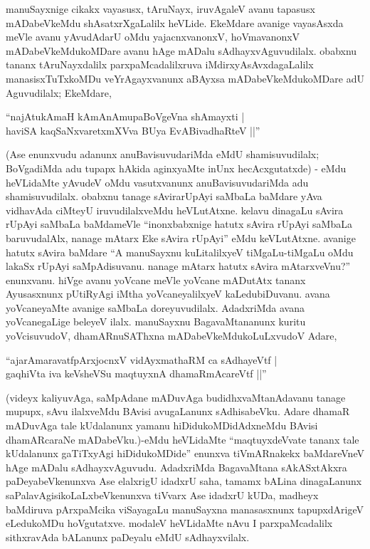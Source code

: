 manuSayxnige cikakx vayasusx, tAruNayx, iruvAgaleV avanu tapasusx mADabeVkeMdu shAsatxrXgaLalilx heVLide. EkeMdare avanige vayasAsxda meVle avanu yAvudAdarU oMdu yajacnxvanonxV, hoVmavanonxV mADabeVkeMdukoMDare avanu hAge mADalu sAdhayxvAguvudilalx. obabxnu tananx tAruNayxdalilx parxpaMcadalilxruva iMdirxyAsAvxdagaLalilx manasisxTuTxkoMDu veYrAgayxvanunx aBAyxsa mADabeVkeMdukoMDare adU Aguvudilalx; EkeMdare,

\begin{shloka}
``najAtukAmaH kAmAnAmupaBoVgeVna shAmayxti |\\
haviSA kaqSaNxvaretxmXVva BUya EvABivadhaRteV ||''
\end{shloka}

(Ase enunxvudu adanunx anuBavisuvudariMda eMdU shamisuvudilalx; BoVgadiMda adu tupapx hAkida aginxyaMte inUnx hecAcxgutatxde) - eMdu heVLidaMte yAvudeV oMdu vasutxvanunx anuBavisuvudariMda adu shamisuvudilalx. obabxnu tanage sAvirarUpAyi saMbaLa baMdare yAva vidhavAda ciMteyU iruvudilalxveMdu heVLutAtxne. kelavu dinagaLu sAvira rUpAyi saMbaLa baMdameVle ``inonxbabxnige hatutx sAvira rUpAyi saMbaLa baruvudalAlx, nanage mAtarx Eke sAvira rUpAyi'' eMdu keVLutAtxne. avanige hatutx sAvira baMdare ``A manuSayxnu kuLitalilxyeV tiMgaLu-tiMgaLu oMdu lakaSx rUpAyi saMpAdisuvanu. nanage mAtarx hatutx sAvira mAtarxveVnu?'' enunxvanu. hiVge avanu yoVcane meVle yoVcane mADutAtx tananx Ayusasxnunx pUtiRyAgi iMtha yoVcaneyalilxyeV kaLedubiDuvanu. avana yoVcaneyaMte avanige saMbaLa doreyuvudilalx. AdadxriMda avana yoVcanegaLige beleyeV ilalx. manuSayxnu BagavaMtananunx kuritu yoVcisuvudoV, dhamARnuSAThxna mADabeVkeMdukoLuLxvudoV Adare,

\begin{shloka}
``ajarAmaravatfpArxjocnxV vidAyxmathaRM ca sAdhayeVtf |\\
gaqhiVta iva keVsheVSu maqtuyxnA dhamaRmAcareVtf ||''
\end{shloka}

(videyx kaliyuvAga, saMpAdane mADuvAga budidhxvaMtanAdavanu tanage mupupx, sAvu ilalxveMdu BAvisi avugaLanunx sAdhisabeVku. Adare dhamaR mADuvAga tale kUdalanunx yamanu hiDidukoMDidAdxneMdu BAvisi dhamARcaraNe mADabeVku.)-eMdu heVLidaMte ``maqtuyxdeVvate tananx tale kUdalanunx gaTiTxyAgi hiDidukoMDide'' enunxva tiVmARnakekx baMdareVneV hAge mADalu sAdhayxvAguvudu. AdadxriMda BagavaMtana sAkASxtAkxra paDeyabeVkenunxva Ase elalxrigU idadxrU saha, tamamx bALina dinagaLanunx saPalavAgisikoLaLxbeVkenunxva tiVvarx Ase idadxrU kUDa, madheyx baMdiruva pArxpaMcika viSayagaLu manuSayxna manasasxnunx tapupxdArigeV eLedukoMDu hoVgutatxve. modaleV heVLidaMte nAvu I parxpaMcadalilx sithxravAda bALanunx paDeyalu eMdU sAdhayxvilalx.

